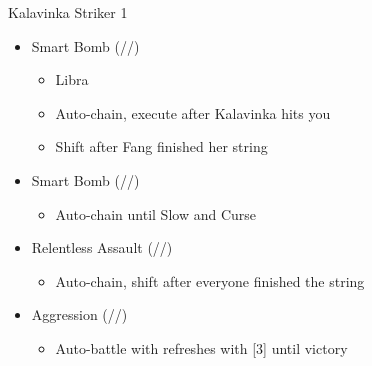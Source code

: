 	\renewcommand{\first}{[1] Smart Bomb (\rav/\rav/\sab)}
	\renewcommand{\second}{[2] Aggression (\com/\rav/\com)}
	\renewcommand{\third}{[3] Smart Bomb (\rav/\rav/\sab)}
	\renewcommand{\fourth}{[4] Aggression (\com/\rav/\com)}
	\renewcommand{\fifth}{[5] Relentless Assault (\rav/\rav/\com)}
	\renewcommand{\sixth}{[6] Relentless Assault (\rav/\rav/\com)}
	
	\begin{battle}[0:52]{Kalavinka Striker 1}
		\begin{itemize}
			\item \first
			      \begin{itemize}
				      \item Libra
				      \item Auto-chain, execute after Kalavinka hits you
				      \item Shift after Fang finished her string
			      \end{itemize}
			\item \third
			      \begin{itemize}
				      \item Auto-chain until Slow and Curse
			      \end{itemize}
			\item \fifth
			      \begin{itemize}
				      \item Auto-chain, shift after everyone finished the string
			      \end{itemize}
			\item \fourth
			      \begin{itemize}
				      \item Auto-battle with refreshes with [3] until victory
			      \end{itemize}
		\end{itemize}
	\end{battle}
